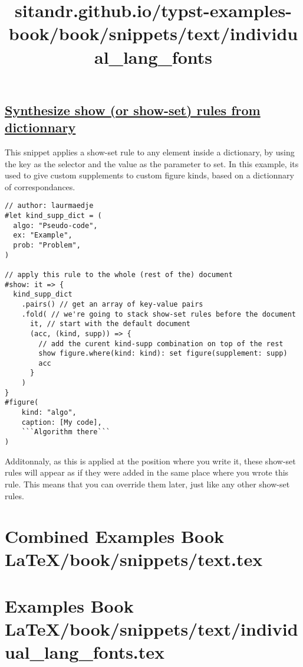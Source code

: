 \subsection{\texorpdfstring{\hyperref[synthesize-show-or-show-set-rules-from-dictionnary]{Synthesize
show (or show-set) rules from
dictionnary}}{Synthesize show (or show-set) rules from dictionnary}}\label{synthesize-show-or-show-set-rules-from-dictionnary}

This snippet applies a show-set rule to any element inside a dictionary,
by using the key as the selector and the value as the parameter to set.
In this example, it\textquotesingle s used to give custom supplements to
custom figure kinds, based on a dictionnary of correspondances.

\begin{verbatim}
// author: laurmaedje
#let kind_supp_dict = (
  algo: "Pseudo-code",
  ex: "Example",
  prob: "Problem",
)

// apply this rule to the whole (rest of the) document
#show: it => {
  kind_supp_dict
    .pairs() // get an array of key-value pairs
    .fold( // we're going to stack show-set rules before the document
      it, // start with the default document
      (acc, (kind, supp)) => {
        // add the curent kind-supp combination on top of the rest
        show figure.where(kind: kind): set figure(supplement: supp)
        acc
      }
    )
}
#figure(
    kind: "algo",
    caption: [My code],
    ```Algorithm there```
)
\end{verbatim}

\pandocbounded{}

Additonnaly, as this is applied at the position where you write it,
these show-set rules will appear as if they were added in the same place
where you wrote this rule. This means that you can override them later,
just like any other show-set rules.




\section{Combined Examples Book LaTeX/book/snippets/text.tex}
\section{Examples Book LaTeX/book/snippets/text/individual_lang_fonts.tex}
\title{sitandr.github.io/typst-examples-book/book/snippets/text/individual_lang_fonts}

